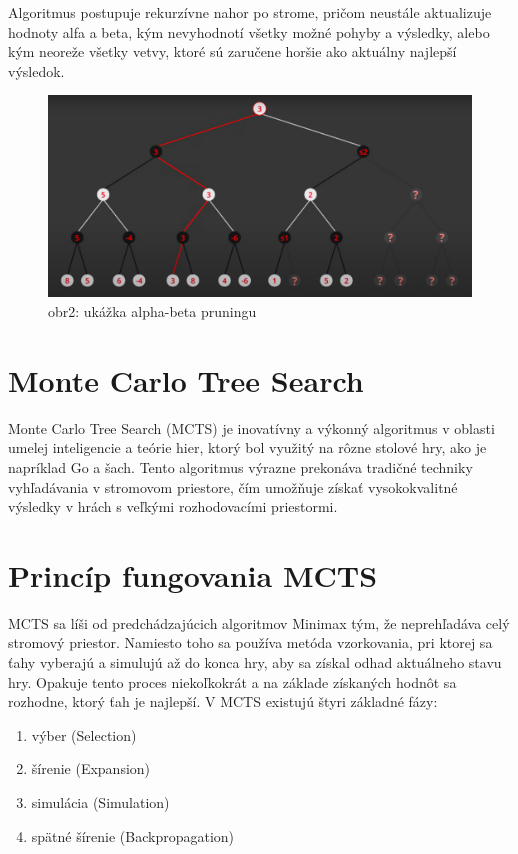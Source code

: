 \documentclass[10pt,twoside,slovak,a4paper]{article}
\begin{document}
Algoritmus postupuje rekurzívne nahor po strome, pričom neustále aktualizuje hodnoty alfa a beta, kým nevyhodnotí všetky možné pohyby a výsledky, alebo kým neoreže všetky vetvy, ktoré sú zaručene horšie ako aktuálny najlepší výsledok.
\begin{figure}[h]
    \centering
    \includegraphics[width=\textwidth]{alpha-beta}
    \caption{obr2: ukážka alpha-beta pruningu}
    \label{obr2}
\end{figure}


\section{Monte Carlo Tree Search} \label{MonteCarlo}
Monte Carlo Tree Search (MCTS) je inovatívny a výkonný algoritmus v oblasti umelej inteligencie a teórie hier, ktorý bol využitý na rôzne stolové hry, ako je napríklad Go a šach. Tento algoritmus výrazne prekonáva tradičné techniky vyhľadávania v stromovom priestore, čím umožňuje získať vysokokvalitné výsledky v hrách s veľkými rozhodovacími priestormi.

\section{Princíp fungovania MCTS} \label{PrincipMTCS}
MCTS sa líši od predchádzajúcich algoritmov Minimax tým, že neprehľadáva celý stromový priestor. Namiesto toho sa používa metóda vzorkovania, pri ktorej sa ťahy vyberajú a simulujú až do konca hry, aby sa získal odhad aktuálneho stavu hry. Opakuje tento proces niekoľkokrát a na základe získaných hodnôt sa rozhodne, ktorý ťah je najlepší. V MCTS existujú štyri základné fázy:
\begin{enumerate}
	\item výber (Selection)
	\item šírenie (Expansion)
	\item simulácia (Simulation)
	\item spätné šírenie (Backpropagation)
\end{enumerate}
\end{document}
